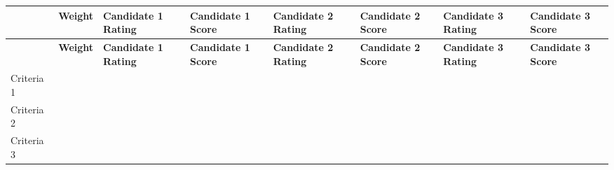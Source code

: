\documentclass[10pt,letterpaper]{article}
\renewcommand\arraystretch{1.25}
\newcommand{\smallsection}[1]{\par\Needspace{3\baselineskip}\vspace{5pt}{\normalsize\sffamily\bfseries\color{blue}#1}\par}
\begin{document}
\smallsection{Source table 2}
\begin{landscape}
\begin{center}
\begingroup
\setlength\tabcolsep{2.0pt}
\scriptsize
\renewcommand\arraystretch{1.55}
\begin{longtable}{|>{\raggedright\arraybackslash}p{1.026in}|>{\raggedright\arraybackslash}p{1.026in}|>{\raggedright\arraybackslash}p{1.026in}|>{\raggedright\arraybackslash}p{1.026in}|>{\raggedright\arraybackslash}p{1.026in}|>{\raggedright\arraybackslash}p{1.026in}|>{\raggedright\arraybackslash}p{1.026in}|>{\raggedright\arraybackslash}p{1.026in}|}
\hline
\rowcolor{light}
\rule{0pt}{11pt}\hspace{0pt} & \textbf{Weight} & \textbf{Candidate 1 Rating} & \textbf{Candidate 1 Score} & \textbf{Candidate 2 Rating} & \textbf{Candidate 2 Score} & \textbf{Candidate 3 Rating} & \textbf{Candidate 3 Score} \\ \hline
\endfirsthead
\hline\rowcolor{light} \rule{0pt}{11pt}\hspace{0pt} & \textbf{Weight} & \textbf{Candidate 1 Rating} & \textbf{Candidate 1 Score} & \textbf{Candidate 2 Rating} & \textbf{Candidate 2 Score} & \textbf{Candidate 3 Rating} & \textbf{Candidate 3 Score} \\ \hline
\endhead
Criteria 1 & \rule{0pt}{11pt}\hspace{0pt} & \rule{0pt}{11pt}\hspace{0pt} & \rule{0pt}{11pt}\hspace{0pt} & \rule{0pt}{11pt}\hspace{0pt} & \rule{0pt}{11pt}\hspace{0pt} & \rule{0pt}{11pt}\hspace{0pt} & \rule{0pt}{11pt}\hspace{0pt} \\ \hline
Criteria 2 & \rule{0pt}{11pt}\hspace{0pt} & \rule{0pt}{11pt}\hspace{0pt} & \rule{0pt}{11pt}\hspace{0pt} & \rule{0pt}{11pt}\hspace{0pt} & \rule{0pt}{11pt}\hspace{0pt} & \rule{0pt}{11pt}\hspace{0pt} & \rule{0pt}{11pt}\hspace{0pt} \\ \hline
Criteria 3 & \rule{0pt}{11pt}\hspace{0pt} & \rule{0pt}{11pt}\hspace{0pt} & \rule{0pt}{11pt}\hspace{0pt} & \rule{0pt}{11pt}\hspace{0pt} & \rule{0pt}{11pt}\hspace{0pt} & \rule{0pt}{11pt}\hspace{0pt} & \rule{0pt}{11pt}\hspace{0pt} \\ \hline

\end{longtable}
\end{center}
\end{landscape}
\end{document}

